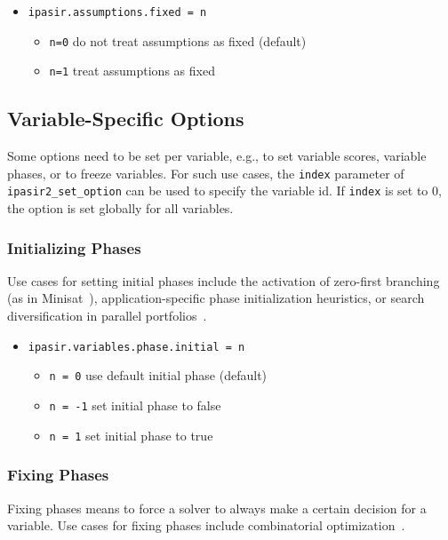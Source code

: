 \documentclass[sat]{iosart2x}
\begin{document}
\begin{itemize}
    \item \texttt{ipasir.assumptions.fixed = n}
    \begin{itemize}
        \item \texttt{n=0} do not treat assumptions as fixed (default)
        \item \texttt{n=1} treat assumptions as fixed
    \end{itemize}
\end{itemize}


\subsection{Variable-Specific Options}\label{sec:variableoptions}
Some options need to be set per variable, e.g., to set variable scores, variable phases, or to freeze variables.
For such use cases, the \texttt{index} parameter of \texttt{ipasir2\_set\_option} can be used to specify the variable id.
If \texttt{index} is set to $0$, the option is set globally for all variables.

\subsubsection{Initializing Phases}
Use cases for setting initial phases include the activation of zero-first branching (as in Minisat~\cite{Niklas:2003:Minisat}), application-specific phase initialization heuristics, or search diversification in parallel portfolios~\cite{Hamadi:2010:ParallelPortfolio}.

\begin{itemize}
    \item \texttt{ipasir.variables.phase.initial = n} 
    \begin{itemize}
        \item \texttt{n = 0} use default initial phase (default)
        \item \texttt{n = -1} set initial phase to false
        \item \texttt{n = 1} set initial phase to true
    \end{itemize}
\end{itemize}

\subsubsection{Fixing Phases}
Fixing phases means to force a solver to always make a certain decision for a variable.
Use cases for fixing phases include combinatorial optimization~\cite{Cohen:2021:LSOpt}.
\end{document}
